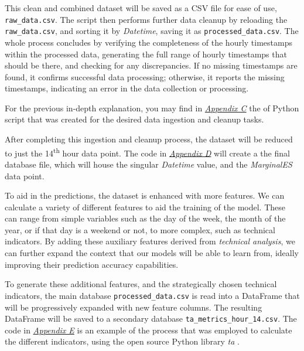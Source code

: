 \documentclass[12pt]{report} %
\begin{document}
This clean and combined dataset will be saved as a CSV file for ease of use, \small{\verb|raw_data.csv|}. The script then performs further data cleanup by reloading the \small{\verb|raw_data.csv|}, and sorting it by \textit{Datetime}, saving it as \small{\verb|processed_data.csv|}. The whole process concludes by verifying the completeness of the hourly timestamps within the processed data, generating the full range of hourly timestamps that should be there, and checking for any discrepancies. If no missing timestamps are found, it confirms successful data processing; otherwise, it reports the missing timestamps, indicating an error in the data collection or processing.

For the previous in-depth explanation, you may find in \textit{\hyperref[app:appendix_c_ingestion_n_cleanup]{Appendix C}} the of Python script that was created for the desired data ingestion and cleanup tasks.

After completing this ingestion and cleanup process, the dataset will be reduced to just the 14\textsuperscript{th} hour data point. The code in \textit{\hyperref[app:appendix_d_dataset_reduction]{Appendix D}} will create a the final database file, which will house the singular \textit{Datetime} value, and the \textit{MarginalES} data point.

To aid in the predictions, the dataset is enhanced with more features. We can calculate a variety of different features to aid the training of the model. These can range from simple variables such as the day of the week, the month of the year, or if that day is a weekend or not, to more complex, such as technical indicators. By adding these auxiliary features derived from \textit{technical analysis}, we can further expand the context that our models will be able to learn from, ideally improving their prediction accuracy capabilities.

To generate these additional features, and the strategically chosen technical indicators, the main database \small{\verb|processed_data.csv|} is read into a DataFrame that will be progressively expanded with new feature columns. The resulting DataFrame will be saved to a secondary database \small{\verb|ta_metrics_hour_14.csv|}. The code in \textit{\hyperref[app:appendix_e_ta_feature_calculations]{Appendix E}} is an example of the process that was employed to calculate the different indicators, using the open source Python library \textit{ta} \cite{ta-lib}.


\end{document}
